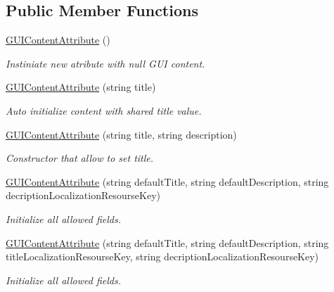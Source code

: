 \subsection*{Public Member Functions}
\begin{DoxyCompactItemize}
\item 
\mbox{\hyperlink{class_wpf_handler_1_1_u_i_1_1_g_u_i_content_attribute_ac2a5bef97b1df0ab4dfd1e9764710d06}{G\+U\+I\+Content\+Attribute}} ()
\begin{DoxyCompactList}\small\item\em Instiniate new atribute with null G\+UI content. \end{DoxyCompactList}\item 
\mbox{\hyperlink{class_wpf_handler_1_1_u_i_1_1_g_u_i_content_attribute_a26546834215fbd36a79b7811ddc0adfe}{G\+U\+I\+Content\+Attribute}} (string title)
\begin{DoxyCompactList}\small\item\em Auto initialize content with shared title value. \end{DoxyCompactList}\item 
\mbox{\hyperlink{class_wpf_handler_1_1_u_i_1_1_g_u_i_content_attribute_ad64c2fed8f65549ff65ba1bfa3185e05}{G\+U\+I\+Content\+Attribute}} (string title, string description)
\begin{DoxyCompactList}\small\item\em Constructor that allow to set title. \end{DoxyCompactList}\item 
\mbox{\hyperlink{class_wpf_handler_1_1_u_i_1_1_g_u_i_content_attribute_a251d3d3299dcd8fed8ae91e315cf8a1c}{G\+U\+I\+Content\+Attribute}} (string default\+Title, string default\+Description, string decription\+Localization\+Resourse\+Key)
\begin{DoxyCompactList}\small\item\em Initialize all allowed fields. \end{DoxyCompactList}\item 
\mbox{\hyperlink{class_wpf_handler_1_1_u_i_1_1_g_u_i_content_attribute_ac5a1a11874d2effe5743f2a4b5532fd2}{G\+U\+I\+Content\+Attribute}} (string default\+Title, string default\+Description, string title\+Localization\+Resourse\+Key, string decription\+Localization\+Resourse\+Key)
\begin{DoxyCompactList}\small\item\em Initialize all allowed fields. \end{DoxyCompactList}\end{DoxyCompactItemize}
